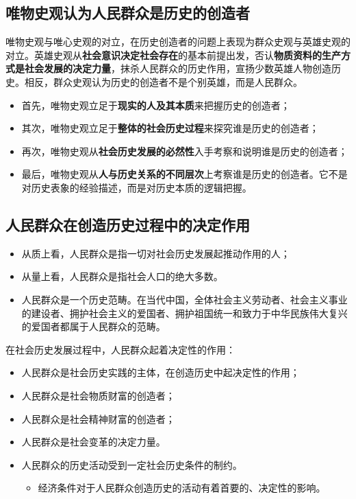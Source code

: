 \documentclass[12pt,openany]{ctexbook}
\newcommand{\zhemph}[1]{{\kaishu #1}}
\begin{document}
\subsection{唯物史观认为人民群众是历史的创造者}
唯物史观与唯心史观的对立，在历史创造者的问题上表现为群众史观与英雄史观的对立。英雄史观从\textbf{社会意识决定社会存在}的基本前提出发，否认\textbf{物质资料的生产方式是社会发展的决定力量}，抹杀人民群众的历史作用，宣扬少数英雄人物创造历史。相反，群众史观认为历史的创造者不是个别英雄，而是人民群众。
\begin{itemize}
  \item 首先，唯物史观立足于\textbf{现实的人及其本质}来把握历史的创造者；
  \item 其次，唯物史观立足于\textbf{整体的社会历史过程}来探究谁是历史的创造者；
  \item 再次，唯物史观从\textbf{社会历史发展的必然性}入手考察和说明谁是历史的创造者；
  \item 最后，唯物史观从\textbf{人与历史关系的不同层次}上考察谁是历史的创造者。它不是对历史表象的经验描述，而是对历史本质的逻辑把握。
\end{itemize}
\subsection{人民群众在创造历史过程中的决定作用}
\begin{mdquote}
\begin{itemize}
  \item 从质上看，人民群众是指一切\zhemph{对社会历史发展起推动作用的人}；
  \item 从量上看，人民群众是指社会人口的绝大多数。
  \item 人民群众是一个历史范畴。在当代中国，全体社会主义劳动者、社会主义事业的建设者、拥护社会主义的爱国者、拥护祖国统一和致力于中华民族伟大复兴的爱国者都属于人民群众的范畴。
\end{itemize}
\end{mdquote}
在社会历史发展过程中，人民群众起着决定性的作用：
\begin{itemize}
  \item 人民群众是社会历史实践的主体，在创造历史中起决定性的作用；
  \item 人民群众是社会物质财富的创造者；
  \item 人民群众是社会精神财富的创造者；
  \item 人民群众是社会变革的决定力量。
  \item 人民群众的历史活动受到一定社会历史条件的制约。
\begin{itemize}
  \item 经济条件对于人民群众创造历史的活动有着首要的、决定性的影响。
\end{itemize}
\end{itemize}
\end{document}

